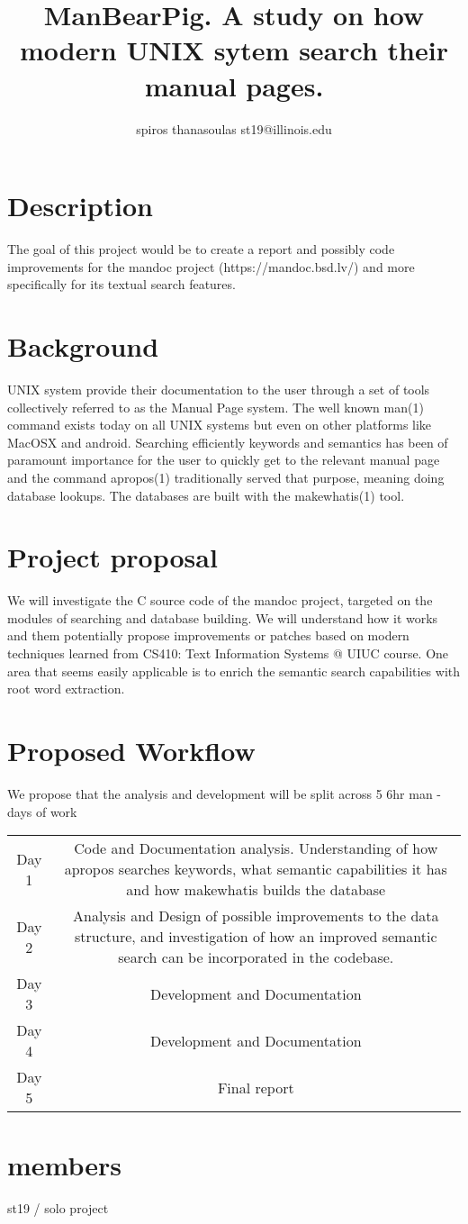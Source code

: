 
\title{ManBearPig. A study on how modern UNIX sytem search their manual pages.}
\author{spiros thanasoulas st19@illinois.edu}

\section{Description}
The goal of this project would be to create a report and possibly code improvements
for the mandoc project (https://mandoc.bsd.lv/) and more specifically for its textual 
search features.

\section{Background}
UNIX system provide their documentation to the user through a set of tools collectively referred to
as the Manual Page system. The well known man(1) command exists today on all UNIX systems but even
on other platforms like MacOSX and android. Searching efficiently keywords and semantics has been
of paramount importance for the user to quickly get to the relevant manual page and the command
apropos(1) traditionally served that purpose, meaning doing database lookups. 
The databases are built with the makewhatis(1) tool.

\section{Project proposal}
We will investigate the C source code of the mandoc project, targeted on the modules of searching
and database building. We will understand how it works and them potentially propose improvements
or patches based on modern techniques learned from CS410: Text Information Systems @ UIUC course.
One area that seems easily applicable is to enrich the semantic search capabilities with root word extraction.


\section{Proposed Workflow}
We propose that the analysis and development will be split across 5 6hr man - days of work

\begin{center}
\begin{tabular}{| c | c |}
\hline
Day 1 & Code and Documentation analysis. Understanding of how apropos searches keywords, what
semantic capabilities it has and how makewhatis builds the database \\
Day 2 & Analysis and Design of possible improvements to the data structure, and investigation of 
how an improved semantic search can be incorporated in the codebase. \\
Day 3 & Development and Documentation  \\
Day 4 & Development and Documentation \\
Day 5 & Final report \\
\hline
\end{tabular}
\end{center}

\section{members}
st19 / solo project 

